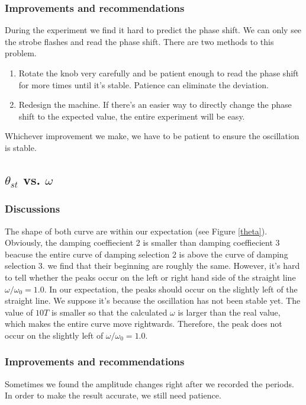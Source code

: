 \subsubsection{Improvements and recommendations}
    During the experiment we find it hard to predict the phase shift. We can only see the strobe flashes and read the phase shift. There are two methods to this problem.
    \begin{enumerate}
        \item Rotate the knob very carefully and be patient enough to read the phase shift for more times until it's stable. Patience can eliminate the deviation.
        \item Redesign the machine. If there's an easier way to directly change the phase shift to the expected value, the entire experiment will be easy.
    \end{enumerate}
    Whichever improvement we make, we have to be patient to ensure the oscillation is stable.

\subsection{$\theta_{st}$ vs. $\omega$}
\subsubsection{Discussions}
    The shape of both curve are within our expectation (see Figure \ref{theta}). Obviously, the damping coeffiecient 2 is smaller than damping coeffiecient 3 beacuse the entire curve of damping selection 2 is above the curve of damping selection 3. we find that their beginning are roughly the same. However, it's hard to tell whether the peaks occur on the left or right hand side of the straight line $\omega/\omega_0=1.0$. In our expectation, the peaks should occur on the slightly left of the straight line. We suppose it's because the oscillation has not been stable yet. The value of $10T$ is smaller so that the calculated $\omega$ is larger than the real value, which makes the entire curve move rightwards. Therefore, the peak does not occur on the slightly left of $\omega/\omega_0=1.0$.

\subsubsection{Improvements and recommendations}
    Sometimes we found the amplitude changes right after we recorded the periods. In order to make the result accurate, we still need patience. 